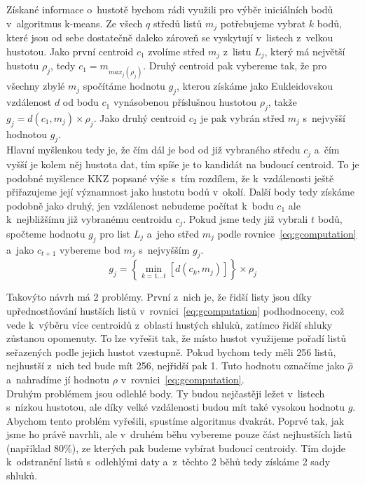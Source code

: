 Získané informace o~hustotě bychom rádi využili pro výběr iniciálních bodů v~algoritmus k-means. Ze všech $q$ středů listů $m_j$ potřebujeme vybrat $k$ bodů, které jsou od sebe dostatečně daleko zároveň se vyskytují v~listech z~velkou hustotou. Jako první centroid $c_1$ zvolíme střed $m_j$ z~listu $L_j$, který má největší hustotu $\rho_j$, tedy $c_1=m_{max_j(\rho_j)}$. Druhý centroid pak vybereme tak, že pro všechny zbylé $m_j$ spočítáme hodnotu $g_j$, kterou získáme jako Eukleidovskou vzdálenost $d$ od bodu $c_1$ vynásobenou příslušnou hustotou $\rho_j$, takže $g_j=d(c_1,m_j) \times \rho_j$. Jako druhý centroid $c_2$ je pak vybrán střed $m_j$ s~nejvyšší hodnotou $g_j$.\\

Hlavní myšlenkou tedy je, že čím dál je bod od již vybraného středu $c_j$ a~čím vyšší je kolem něj hustota dat, tím spíše je to kandidát na budoucí centroid. To je podobné myšlence KKZ popsané výše s~tím rozdílem, že k~vzdálenosti ještě přiřazujeme její významnost jako hustotu bodů v~okolí. Další body tedy získáme podobně jako druhý, jen vzdálenost nebudeme počítat k~bodu $c_1$ ale k~nejbližšímu již vybranému centroidu $c_j$. Pokud jsme tedy již vybrali $t$ bodů, spočteme hodnotu $g_j$ pro list $L_j$ a~jeho střed $m_j$ podle rovnice~\ref{eq:gcomputation} a~jako $c_{t+1}$ vybereme bod $m_j$ s~nejvyšším $g_j$.\\
\begin{equation}\label{eq:gcomputation}
g_j = \left\{\min\limits_{k=1...t}\left[d\left( c_k,m_j \right)\right]\right\}\times\rho_j
\end{equation}

Takovýto návrh má 2 problémy. První z~nich je, že řidší listy jsou díky upřednostňování hustších listů v~rovnici~\ref{eq:gcomputation} podhodnoceny, což vede k~výběru více centroidů z~oblasti hustých shluků, zatímco řidší shluky zůstanou opomenuty. To lze vyřešit tak, že místo hustot využijeme pořadí listů seřazených podle jejich hustot vzestupně. Pokud bychom tedy měli 256 listů, nejhustší z~nich ted bude mít 256, nejřidší pak 1. Tuto hodnotu označíme jako $\widehat{\rho}$ a~nahradíme jí hodnotu $\rho$ v~rovnici~\ref{eq:gcomputation}.\\

Druhým problémem jsou odlehlé body. Ty budou nejčastěji ležet v~listech s~nízkou hustotou, ale díky velké vzdálenosti budou mít také vysokou hodnotu $g$. Abychom tento problém vyřešili, spustíme algoritmus dvakrát. Poprvé tak, jak jsme ho právě navrhli, ale v~druhém běhu vybereme pouze část nejhustších listů (například 80\%), ze kterých pak budeme vybírat budoucí centroidy. Tím dojde k~odstranění listů s~odlehlými daty a~z~těchto 2 běhů tedy získáme 2 sady shluků.

